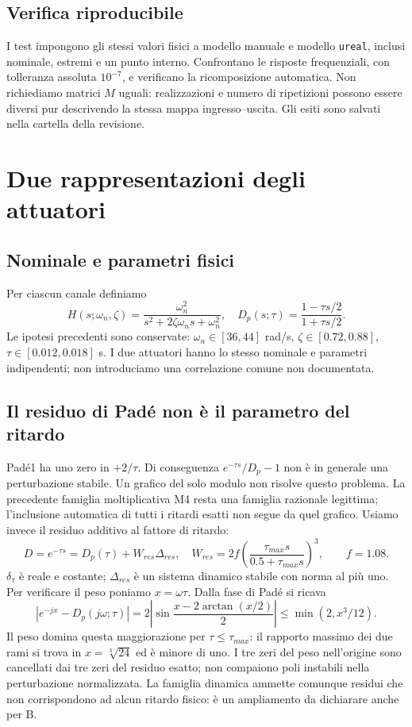 \section{Verifica riproducibile}
I test impongono gli stessi valori fisici a modello manuale e modello
\texttt{ureal}, inclusi nominale, estremi e un punto interno. Confrontano
le risposte frequenziali, con tolleranza assoluta $10^{-7}$, e verificano
la ricomposizione automatica. Non richiediamo matrici $M$ uguali:
realizzazioni e numero di ripetizioni possono essere diversi pur descrivendo
la stessa mappa ingresso--uscita. Gli esiti sono salvati nella cartella
della revisione.

\chapter{Due rappresentazioni degli attuatori}
\section{Nominale e parametri fisici}
Per ciascun canale definiamo
\[
H(s;\omega_n,\zeta)=\frac{\omega_n^2}{s^2+2\zeta\omega_ns+\omega_n^2},\quad
D_p(s;\tau)=\frac{1-\tau s/2}{1+\tau s/2}.
\]
Le ipotesi precedenti sono conservate: $\omega_n\in[36,44]$ rad/s,
$\zeta\in[0.72,0.88]$, $\tau\in[0.012,0.018]$ s. I due attuatori
hanno lo stesso nominale e parametri indipendenti; non introduciamo una
correlazione comune non documentata.
\section{Il residuo di Padé non è il parametro del ritardo}
Padé1 ha uno zero in $+2/\tau$. Di conseguenza
$e^{-\tau s}/D_p-1$ non è in generale una perturbazione stabile.
Un grafico del solo modulo non risolve questo problema. La precedente
famiglia moltiplicativa M4 resta una famiglia razionale legittima;
l'inclusione automatica di tutti i ritardi esatti non segue da quel grafico.
Usiamo invece il residuo additivo al fattore di ritardo:
\[
D=e^{-\tau s}=D_p(\tau)+W_{res}\Delta_{res},\quad
W_{res}=2f\left(\frac{\tau_{max}s}{0.5+\tau_{max}s}\right)^3,
\qquad f=1.08.
\]
$\delta_\tau$ è reale e costante; $\Delta_{res}$ è un sistema dinamico
stabile con norma al più uno. Per verificare il peso poniamo $x=\omega\tau$.
Dalla fase di Padé si ricava
\[
|e^{-jx}-D_p(j\omega;\tau)|
=2\left|\sin\frac{x-2\arctan(x/2)}2\right|
\le\min(2,x^3/12).
\]
Il peso domina questa maggiorazione per $\tau\le\tau_{max}$: il rapporto
massimo dei due rami si trova in $x=\sqrt[3]{24}$ ed è minore di uno.
I tre zeri del peso nell'origine sono cancellati dai tre zeri del residuo
esatto; non compaiono poli instabili nella perturbazione normalizzata.
La famiglia dinamica ammette comunque residui che non corrispondono ad alcun
ritardo fisico: è un ampliamento da dichiarare anche per B.
